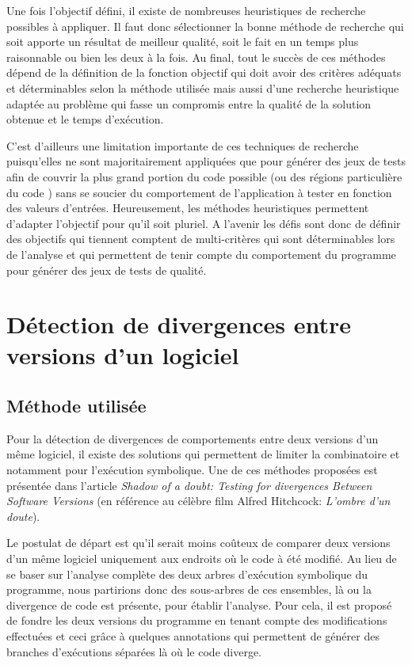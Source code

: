 Une fois l'objectif défini, il existe de nombreuses heuristiques de recherche possibles à appliquer. Il faut donc sélectionner la bonne méthode de recherche qui soit apporte un résultat de meilleur qualité, soit le fait en un temps plus raisonnable ou bien les deux à la fois.
Au final, tout le succès de ces méthodes dépend de la définition de la fonction objectif qui doit avoir des critères adéquats et déterminables selon la méthode utilisée mais aussi d'une recherche heuristique adaptée au problème qui fasse un compromis entre la qualité de la solution obtenue et le temps d'exécution.

C'est d'ailleurs une limitation importante de ces techniques de recherche puisqu'elles ne sont majoritairement appliquées que pour générer des jeux de tests afin de couvrir la plus grand portion du code possible (ou des régions particulière du code ) sans se soucier du comportement de l'application à tester en fonction des valeurs d'entrées.
Heureusement, les méthodes heuristiques permettent d'adapter l'objectif pour qu'il soit pluriel. A l'avenir les défis sont donc de définir des objectifs qui tiennent comptent de multi-critères qui sont déterminables lors de l'analyse et qui permettent de tenir compte du comportement du programme pour générer des jeux de tests de qualité.

\section{Détection de divergences entre versions d'un logiciel}

\subsection{Méthode utilisée}
Pour la détection de divergences de comportements entre deux versions d'un même logiciel, il existe des solutions qui permettent de limiter la combinatoire et notamment pour l'exécution symbolique.
Une de ces méthodes proposées est présentée dans l'article \textit{Shadow of a doubt: Testing for divergences Between Software Versions}\cite{shadow} (en référence au célèbre film Alfred Hitchcock: \textit{L'ombre d'un doute}). 

Le postulat de départ est qu'il serait moins coûteux de comparer deux versions d'un même logiciel uniquement aux endroits où le code à été modifié. Au lieu de se baser sur l'analyse complète des deux arbres d'exécution symbolique du programme, nous partirions donc des sous-arbres de ces ensembles, là ou la divergence de code est présente, pour établir l'analyse.
Pour cela, il est proposé de fondre les deux versions du programme en tenant compte des modifications effectuées et ceci grâce à quelques annotations qui permettent de générer des branches d'exécutions séparées là où le code diverge.

